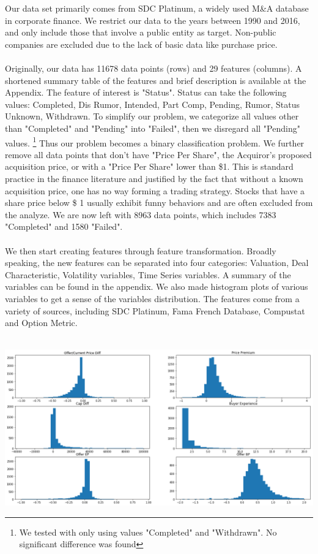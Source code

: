 \documentclass[a4paper]{article}
\begin{document}
Our data set primarily comes from SDC Platinum, a widely used M\&A database in corporate finance. We restrict our data to the years between 1990 and 2016, and only include those that involve a public entity as target. Non-public companies are excluded due to the lack of basic data like purchase price.
\\
\\
Originally, our data has 11678 data points (rows) and 29 features (columns). A shortened summary table of the features and brief description is available at the Appendix. The feature of interest is "Status". Status can take the following values: Completed, Dis Rumor, Intended, Part Comp, Pending, Rumor, Status Unknown, Withdrawn. To simplify our problem, we categorize all values other than "Completed" and "Pending" into "Failed", then we disregard all "Pending" values. \footnote{We tested with only using values "Completed" and "Withdrawn". No significant difference was found} Thus our problem becomes a binary classification problem. We further remove all data points that don't have "Price Per Share", the Acquiror's proposed acquisition price, or with a "Price Per Share" lower than \$1. This is standard practice in the finance literature and justified by the fact that without a known acquisition price, one has no way forming a trading strategy. Stocks that have a share price below \$ 1 usually exhibit funny behaviors and are often excluded from the analyze. We are now left with 8963 data points, which includes 7383 "Completed" and 1580 "Failed".
\\
\\
We then start creating features through feature transformation. Broadly speaking, the new features can be separated into four categories: Valuation, Deal Characteristic, Volatility variables, Time Series variables. A summary of the variables can be found in the appendix. We also made histogram plots of various variables to get a sense of the variables distribution. The features come from a variety of sources, including SDC Platinum, Fama French Database, Compustat and Option Metric.
\\
\\

\begin{center}
\includegraphics[scale=0.32]{hist.png} 
\end{center}
\end{document}
